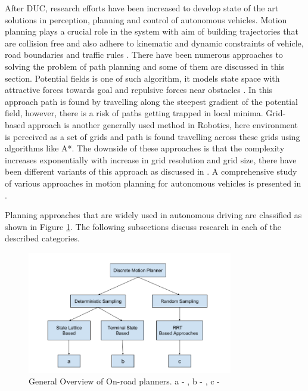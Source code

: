 After DUC, research efforts have been increased to develop state of the art solutions in perception, planning and control of autonomous vehicles. Motion planning plays a crucial role in the system with aim of building trajectories that are collision free and also adhere to kinematic and dynamic constraints of vehicle, road boundaries and traffic rules \cite{motion_planning_techniques}. There have been numerous approaches to solving the problem of path planning and some of them are discussed in this section. Potential fields is one of such algorithm, it models state space with attractive forces towards goal and repulsive forces near obstacles \cite{potential_field_3} \cite{potential_field_1} \cite{potential_field_2}. In this approach path is found by travelling along the steepest gradient of the potential field, however, there is a risk of paths getting trapped in local minima. Grid-based approach is another generally used method in Robotics, here environment is perceived as a set of grids and path is found travelling across these grids using algorithms like A*. The downside of these approaches is that the complexity increases exponentially with increase in grid resolution and grid size, there have been different variants of this approach as discussed in \cite{A_star} \cite{D_star_1} \cite{kolski_thesis}. A comprehensive study of various approaches in motion planning for autonomous vehicles is presented in \cite{motion_planning_techniques} \cite{survey_planning_techniques}.

 Planning approaches that are widely used in autonomous driving are classified as shown in Figure \ref{related_work_classification}. The following subsections discuss research in each of the described categories. 

\begin{figure}[H]
	\centering
	\includegraphics[width=0.8\textwidth]{Images/related_work/planning_division.png}
	\caption{General Overview of On-road planners. a - \cite{cmu_parallel_thesis}  \cite{diss_shui_phd_thesis} \cite{traj_planner_optimization} \cite{lattice_Gu_Tiyanu} \cite{unit_A_star} , b - \cite{kolski_thesis} \cite{real_time_traj_plan_article} \cite{darpa_urban_challenge}, c -\cite{rrt_star} \cite{rrt_urban_driv} \cite{mit_rrt}
	}
	\label{related_work_classification}
\end{figure}

